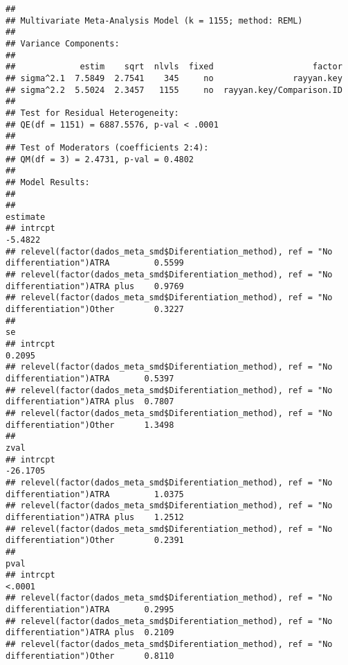 \documentclass[
]{article}
\begin{document}
\begin{verbatim}
## 
## Multivariate Meta-Analysis Model (k = 1155; method: REML)
## 
## Variance Components:
## 
##             estim    sqrt  nlvls  fixed                    factor 
## sigma^2.1  7.5849  2.7541    345     no                rayyan.key 
## sigma^2.2  5.5024  2.3457   1155     no  rayyan.key/Comparison.ID 
## 
## Test for Residual Heterogeneity:
## QE(df = 1151) = 6887.5576, p-val < .0001
## 
## Test of Moderators (coefficients 2:4):
## QM(df = 3) = 2.4731, p-val = 0.4802
## 
## Model Results:
## 
##                                                                                             estimate 
## intrcpt                                                                                      -5.4822 
## relevel(factor(dados_meta_smd$Diferentiation_method), ref = "No differentiation")ATRA         0.5599 
## relevel(factor(dados_meta_smd$Diferentiation_method), ref = "No differentiation")ATRA plus    0.9769 
## relevel(factor(dados_meta_smd$Diferentiation_method), ref = "No differentiation")Other        0.3227 
##                                                                                                 se 
## intrcpt                                                                                     0.2095 
## relevel(factor(dados_meta_smd$Diferentiation_method), ref = "No differentiation")ATRA       0.5397 
## relevel(factor(dados_meta_smd$Diferentiation_method), ref = "No differentiation")ATRA plus  0.7807 
## relevel(factor(dados_meta_smd$Diferentiation_method), ref = "No differentiation")Other      1.3498 
##                                                                                                 zval 
## intrcpt                                                                                     -26.1705 
## relevel(factor(dados_meta_smd$Diferentiation_method), ref = "No differentiation")ATRA         1.0375 
## relevel(factor(dados_meta_smd$Diferentiation_method), ref = "No differentiation")ATRA plus    1.2512 
## relevel(factor(dados_meta_smd$Diferentiation_method), ref = "No differentiation")Other        0.2391 
##                                                                                               pval 
## intrcpt                                                                                     <.0001 
## relevel(factor(dados_meta_smd$Diferentiation_method), ref = "No differentiation")ATRA       0.2995 
## relevel(factor(dados_meta_smd$Diferentiation_method), ref = "No differentiation")ATRA plus  0.2109 
## relevel(factor(dados_meta_smd$Diferentiation_method), ref = "No differentiation")Other      0.8110 

\end{verbatim}
\end{document}
